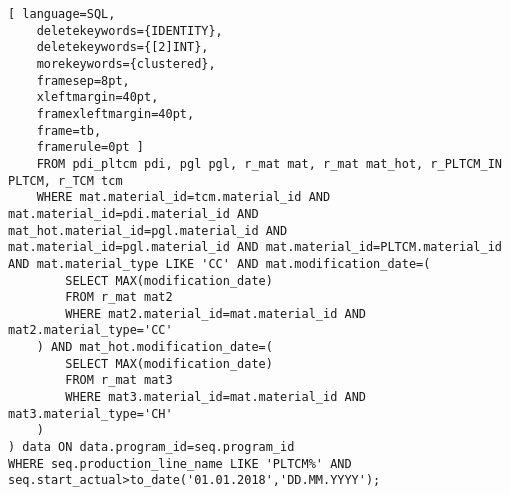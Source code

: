 \documentclass{article}
\begin{document}
\begin{lstlisting}[ language=SQL,
	deletekeywords={IDENTITY},
	deletekeywords={[2]INT},
	morekeywords={clustered},
	framesep=8pt,
	xleftmargin=40pt,
	framexleftmargin=40pt,
	frame=tb,
	framerule=0pt ]
	FROM pdi_pltcm pdi, pgl pgl, r_mat mat, r_mat mat_hot, r_PLTCM_IN PLTCM, r_TCM tcm
	WHERE mat.material_id=tcm.material_id AND mat.material_id=pdi.material_id AND mat_hot.material_id=pgl.material_id AND mat.material_id=pgl.material_id AND mat.material_id=PLTCM.material_id AND mat.material_type LIKE 'CC' AND mat.modification_date=(
		SELECT MAX(modification_date)
		FROM r_mat mat2 
		WHERE mat2.material_id=mat.material_id AND mat2.material_type='CC'
	) AND mat_hot.modification_date=(
		SELECT MAX(modification_date)
		FROM r_mat mat3
		WHERE mat3.material_id=mat.material_id AND mat3.material_type='CH'
	)
) data ON data.program_id=seq.program_id
WHERE seq.production_line_name LIKE 'PLTCM%' AND seq.start_actual>to_date('01.01.2018','DD.MM.YYYY');
\end{lstlisting}
	
\end{document}
